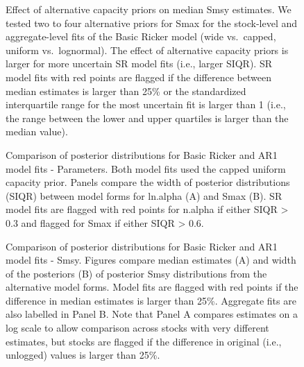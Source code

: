 \documentclass[french,11pt]{book}
\begin{document}
\begin{figure}[htb]

{\centering {} 

}

\caption{Effect of alternative capacity priors on median Smsy estimates. We tested two to four alternative priors for Smax for the stock-level and aggregate-level fits of the Basic Ricker model (wide vs.~capped, uniform vs.~lognormal). The effect of alternative capacity priors is larger for more uncertain SR model fits (i.e., larger SIQR). SR model fits with red points are flagged if the difference between median estimates is larger than 25\% or the standardized interquartile range for the most uncertain fit is larger than 1 (i.e., the range between the lower and upper quartiles is larger than the median value).}\label{fig:FitsCompCapPrior}
\end{figure}
\clearpage


\begin{figure}[htb]

{\centering {} 

}

\caption{Comparison of posterior distributions for Basic Ricker and AR1 model fits - Parameters. Both model fits used the capped uniform capacity prior. Panels compare the width of posterior distributions (SIQR) between model forms for ln.alpha (A) and Smax (B). SR model fits are flagged with red points for n.alpha if either SIQR \textgreater{} 0.3 and flagged for Smax if either SIQR \textgreater{} 0.6.}\label{fig:FitsCompAR1Pars}
\end{figure}
\clearpage


\begin{figure}[htb]

{\centering {} 

}

\caption{Comparison of posterior distributions for Basic Ricker and AR1 model fits - Smsy. Figures compare median estimates (A) and width of the posteriors (B) of posterior Smsy distributions from the alternative model forms. Model fits are flagged with red points if the difference in median estimates is larger than 25\%. Aggregate fits are also labelled in Panel B. Note that Panel A compares estimates on a log scale to allow comparison across stocks with very different estimates, but stocks are flagged if the difference in original (i.e., unlogged) values is larger than 25\%.}\label{fig:FitsCompAR1Smsy}
\end{figure}
\clearpage
\end{document}

